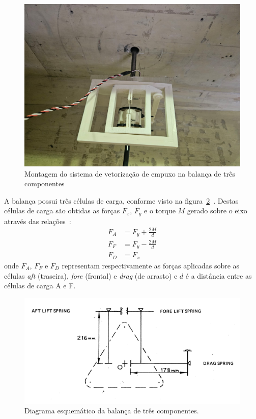 \begin{figure}[htbp]
    \centering
    \includegraphics[width=\textwidth]{img/montagem_interna.jpeg}
    \caption{Montagem do sistema de vetorização de empuxo na balança de três componentes}\label{fig:montagem_interna}
\end{figure}

A balança possui três células de carga, conforme visto na figura~\ref{fig:scale_diagram}~\cite{lab}. Destas células de carga são obtidas as forças \(F_x\), \(F_y\) e o torque \(M\) gerado sobre o eixo através das relações~\cite{lab}:
\begin{align}
    F_A &= F_y + \frac{2M}{d} \label{eq:FA}\\
    F_F &= F_y - \frac{2M}{d} \label{eq:FF}\\
    F_D &= F_x \label{eq:FD}
\end{align}
onde \(F_A\), \(F_F\) e \(F_D\) representam respectivamente as forças aplicadas sobre as células \textit{aft} (traseira), \textit{fore} (frontal) e \textit{drag} (de arrasto) e \(d\) é a distância entre as células de carga A e F. 

\begin{figure}[htbp]
    \centering
    \includegraphics[width=\textwidth]{img/three_axis_scale_diagram.png}
    \caption{Diagrama esquemático da balança de três componentes.}
    \label{fig:scale_diagram}
\end{figure}

